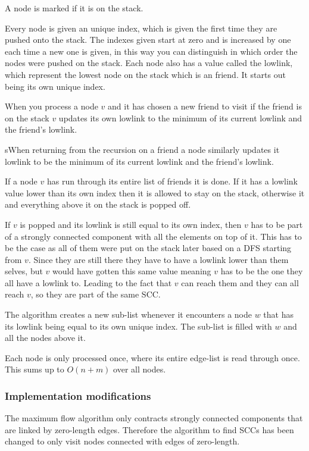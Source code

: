 A node is marked if it is on the stack.

Every node is given an unique index, which is given the first time they are pushed onto the stack. The indexes given start at zero and is increased by one each
time a new one is given,
in this way you can distinguish in which order the nodes were pushed on the stack.
Each node also has a value called the lowlink, which represent the lowest node on the stack which is an friend. It starts out being its own unique index.

When you process a node $v$ and it has chosen a new friend to visit if the friend is on the stack $v$ updates its own lowlink to the minimum of its current lowlink
and the friend's lowlink.

sWhen returning from the recursion on a friend a node similarly updates it lowlink to be the minimum of its current lowlink and the friend's lowlink.

If a node $v$ has run through its entire list of friends it is done. If it has a lowlink value lower than its own index then it is allowed to stay on the 
stack, otherwise it and everything above it on the stack is popped off. 

If $v$ is popped and its lowlink is still equal to its own index, then $v$ has to be part of a strongly connected component with all the elements on top of it. 
This has to be the case as all of them were put on the stack later based on a DFS starting from $v$. 
Since they are still there they have to have a lowlink lower than them selves, but $v$ would have gotten this same value
meaning $v$ has to be the one they all have a lowlink to. Leading to the fact that $v$ can reach them and they can all reach $v$, so they are part
of the same SCC. 

The algorithm creates a new sub-list whenever it encounters a node $w$ that has its lowlink being equal to its own unique index. The sub-list is filled
with $w$ and all the nodes above it.

Each node is only processed once, where its entire edge-list is read through once. This sums up to $O(n+m)$ over all nodes.

\subsubsection{Implementation modifications}
The maximum flow algorithm only contracts strongly connected components that are linked by zero-length edges. Therefore the algorithm to find 
SCCs has been changed to only visit nodes connected with edges of zero-length.


